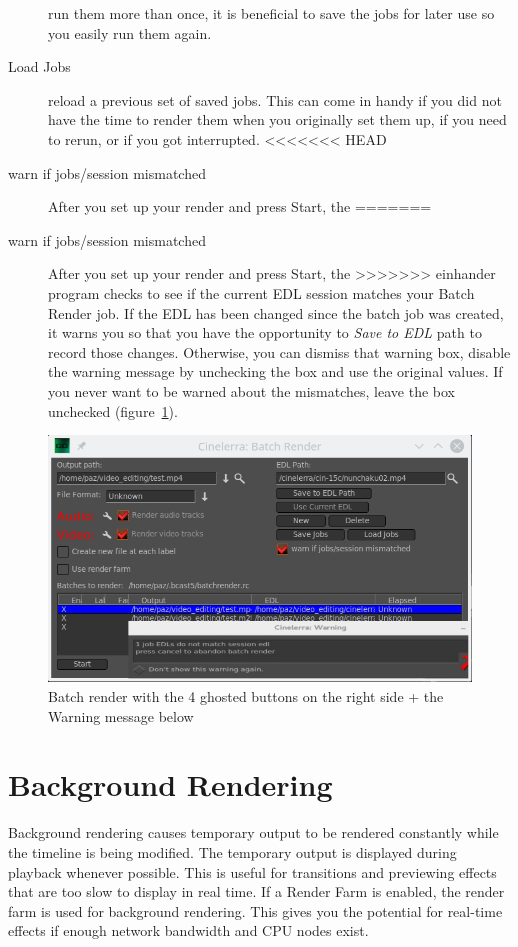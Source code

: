\begin{description}
    run them more than once, it is beneficial to save the jobs for later use so you easily run them again.
    \item[Load Jobs] reload a previous set of saved jobs.  This can come in handy if you did not have the
    time to render them when you originally set them up, if you need to rerun, or if you got interrupted.
<<<<<<< HEAD
    \item[warn if jobs/session mismatched] After you set up your render and press Start, the
=======
    \item[warn if jobs/session mismatched] 
        After you set up your render and press Start, the
>>>>>>> einhander
    program checks to see if the current EDL session matches your Batch Render job.  If the EDL has
    been changed since the batch job was created, it warns you so that you have the opportunity to 
    \textit{Save to EDL} path to record those changes.  Otherwise, you can dismiss that warning box, disable 
    the warning message by unchecking the box and use the original values.  If you never want to be
    warned about the mismatches, leave the box unchecked (figure~\ref{fig:batch02}).
\end{description}

\begin{figure}[htpb]
    \centering
    \includegraphics[width=0.8\linewidth]{images/batch02.png}
    \caption{Batch render with the 4 ghosted buttons on the right side + the Warning message below}
    \label{fig:batch02}
\end{figure}

\section{Background Rendering}%
\label{sec:background_rendering}

Background rendering causes temporary output to be rendered constantly while the timeline is being modified. The temporary output is displayed during playback whenever possible. This is useful for transitions and previewing effects that are too slow to display in real time. If a Render Farm is enabled, the render farm is used for background rendering. This gives you the potential for real-time effects if enough network bandwidth and CPU nodes exist.

